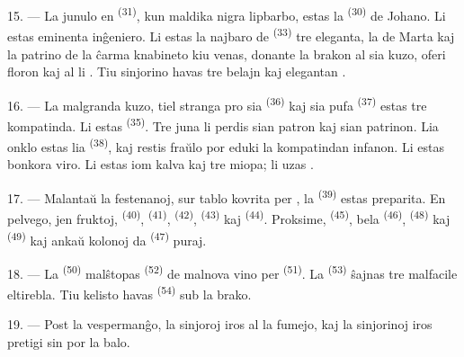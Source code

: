 15. --- La junulo en  \textsuperscript{(31)}, kun maldika nigra
lipbarbo, estas la  \textsuperscript{(30)} de Johano. Li estas
eminenta inĝeniero. Li estas la najbaro de 
\textsuperscript{(33)} tre eleganta, la  de Marta kaj
la patrino de la ĉarma knabineto kiu venas, donante la brakon al sia kuzo,
oferi floron kaj  al li . Tiu sinjorino
havas tre belajn  kaj elegantan .

16. --- La malgranda kuzo, tiel stranga pro sia 
\textsuperscript{(36)} kaj sia pufa  \textsuperscript{(37)}
estas tre kompatinda. Li estas  \textsuperscript{(35)}. Tre juna
li perdis sian patron kaj sian patrinon. Lia onklo estas lia 
\textsuperscript{(38)}, kaj restis fraŭlo por eduki la kompatindan infanon. Li
estas bonkora viro. Li estas iom kalva kaj tre miopa; li uzas
.

\VUsaut{2.4mm}
\VUsaut{3.0mm}

17. --- Malantaŭ la festenanoj, sur tablo kovrita per , la
 \textsuperscript{(39)} estas preparita. En pelvego, jen
fruktoj,  \textsuperscript{(40)}, 
\textsuperscript{(41)},  \textsuperscript{(42)},
 \textsuperscript{(43)} kaj 
\textsuperscript{(44)}. Proksime,  \textsuperscript{(45)},
bela  \textsuperscript{(46)}, 
\textsuperscript{(48)} kaj  \textsuperscript{(49)} kaj ankaŭ
kolonoj da  \textsuperscript{(47)} puraj.

18. --- La  \textsuperscript{(50)} malŝtopas 
\textsuperscript{(52)} de malnova vino per 
\textsuperscript{(51)}. La  \textsuperscript{(53)}
ŝajnas tre malfacile eltirebla. Tiu kelisto havas 
\textsuperscript{(54)} sub la brako.

19. --- Post la vespermanĝo, la sinjoroj iros al la fumejo, kaj la sinjorinoj
iros pretigi sin por la balo.

\VUsaut{5.0mm}
\VUsaut{1.6mm}
\VUsaut{2.6mm}

